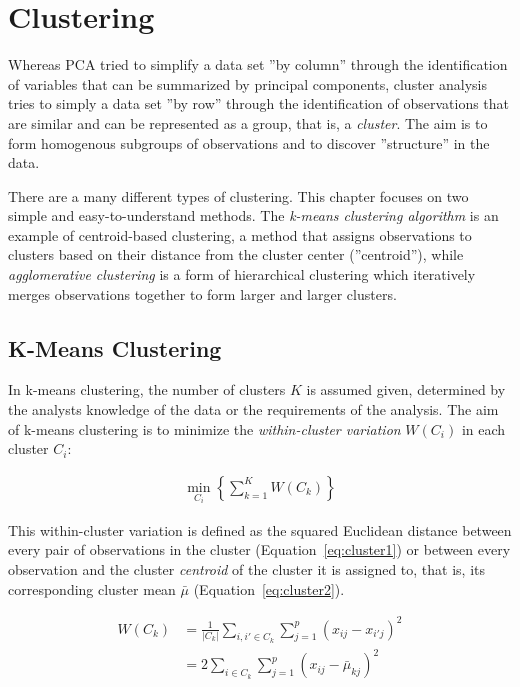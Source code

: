 \section{Clustering}

Whereas PCA tried to simplify a data set ''by column'' through the identification of variables that can be summarized by principal components, cluster analysis tries to simply a data set ''by row'' through the identification of observations that are similar and can be represented as a group, that is, a \emph{cluster}. The aim is to form homogenous subgroups of observations and to discover ''structure'' in the data.

There are a many different types of clustering. This chapter focuses on two simple and easy-to-understand methods. The \emph{k-means clustering algorithm} is an example of centroid-based clustering, a method that assigns observations to clusters based on their distance from the cluster center (''centroid''), while \emph{agglomerative clustering} is a form of hierarchical clustering which iteratively merges observations together to form larger and larger clusters. 

\subsection{K-Means Clustering}

In k-means clustering, the number of clusters $K$ is assumed given, determined by the analysts knowledge of the data or the requirements of the analysis. The aim of k-means clustering is to minimize the \emph{within-cluster variation} $W(C_i)$ in each cluster $C_i$:

\begin{align*}
\min_{C_i} \left\{ \sum_{k=1}^K W(C_k) \right\}
\end{align*}

\noindent This within-cluster variation is defined as the squared Euclidean distance between every pair of observations in the cluster (Equation~\ref{eq:cluster1}) or between every observation and the cluster \emph{centroid} of the cluster it is assigned to, that is, its corresponding cluster mean $\bar{\mu}$ (Equation~\ref{eq:cluster2}).

\begin{align}
W(C_k) &= \frac{1}{|C_k|} \sum_{i,i' \in C_k} \sum_{j=1}^p (x_{ij} - x_{i'j})^2 \label{eq:cluster1} \\
&= 2 \sum_{i \in C_k} \sum_{j=1}^p (x_{ij} - \bar{\mu}_{kj})^2 \label{eq:cluster2}
\end{align}


